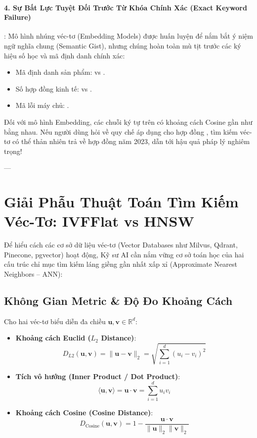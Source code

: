 \paragraph{4. Sự Bất Lực Tuyệt Đối Trước Từ Khóa Chính Xác (Exact Keyword Failure)}:
Mô hình nhúng véc-tơ (Embedding Models) được huấn luyện để nắm bắt ý niệm ngữ nghĩa chung (Semantic Gist), nhưng chúng hoàn toàn mù tịt trước các ký hiệu số học và mã định danh chính xác:
\begin{itemize}
  \item Mã định danh sản phẩm:  vs .
  \item Số hợp đồng kinh tế:  vs .
  \item Mã lỗi máy chủ: .
\end{itemize}
Đối với mô hình Embedding, các chuỗi ký tự trên có khoảng cách Cosine gần như bằng nhau. Nếu người dùng hỏi về quy chế áp dụng cho hợp đồng , tìm kiếm véc-tơ có thể thản nhiên trả về hợp đồng năm 2023, dẫn tới hậu quả pháp lý nghiêm trọng!

---

\section{Giải Phẫu Thuật Toán Tìm Kiếm Véc-Tơ: IVFFlat vs HNSW}
\label{sec:vector-search-hnsw-ivfflat}

Để hiểu cách các cơ sở dữ liệu véc-tơ (Vector Databases như Milvus, Qdrant, Pinecone, pgvector) hoạt động, Kỹ sư AI cần nắm vững cơ sở toán học của hai cấu trúc chỉ mục tìm kiếm láng giềng gần nhất xấp xỉ (Approximate Nearest Neighbors -- ANN):

\subsection{Không Gian Metric \& Độ Đo Khoảng Cách}
Cho hai véc-tơ biểu diễn đa chiều $\mathbf{u}, \mathbf{v} \in \mathbb{R}^d$:
\begin{itemize}
  \item \textbf{Khoảng cách Euclid ($L_2$ Distance)}:
  \begin{equation}
  D_{L2}(\mathbf{u}, \mathbf{v}) = \|\mathbf{u} - \mathbf{v}\|_2 = \sqrt{\sum_{i=1}^d (u_i - v_i)^2}
  \end{equation}
  \item \textbf{Tích vô hướng (Inner Product / Dot Product)}:
  \begin{equation}
  \langle \mathbf{u}, \mathbf{v} \rangle = \mathbf{u} \cdot \mathbf{v} = \sum_{i=1}^d u_i v_i
  \end{equation}
  \item \textbf{Khoảng cách Cosine (Cosine Distance)}:
  \begin{equation}
  D_{\text{Cosine}}(\mathbf{u}, \mathbf{v}) = 1 - \frac{\mathbf{u} \cdot \mathbf{v}}{\|\mathbf{u}\|_2 \|\mathbf{v}\|_2}
  \end{equation}
\end{itemize}


